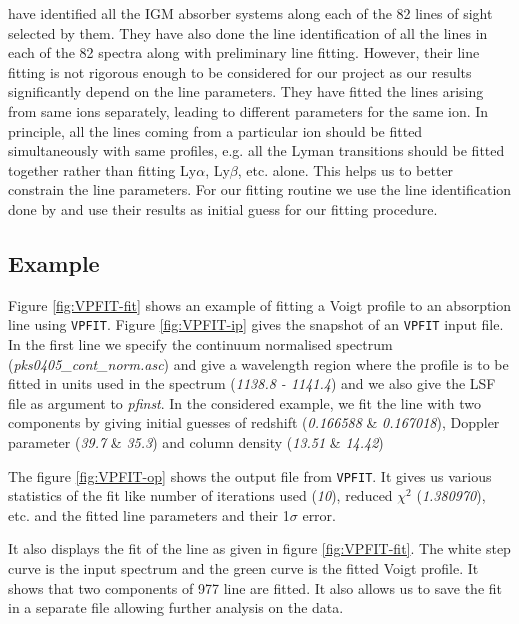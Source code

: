 \citet{danforth-2016} have identified all the IGM absorber systems along each of the 82 lines of sight selected by them. They have also done the line identification of all the lines in each of the 82 spectra along with preliminary line fitting. However, their line fitting is not rigorous enough to be considered for our project as our results significantly depend on the line parameters. They have fitted the lines arising from same ions separately, leading to different parameters for the same ion. In principle, all the lines coming from a particular ion should be fitted simultaneously with same profiles, e.g. all the Lyman transitions should be fitted together rather than fitting Ly$\alpha$, Ly$\beta$, etc. alone. This helps us to better constrain the line parameters. For our fitting routine we use the line identification done by \citet{danforth-2016} and use their results as initial guess for our fitting procedure.

\vfill

\subsection{Example}  \label{sec:VPfit-example}

Figure \ref{fig:VPFIT-fit} shows an example of fitting a Voigt profile to an absorption line using {\tt VPFIT}. Figure \ref{fig:VPFIT-ip} gives the snapshot of an {\tt VPFIT} input file. In the first line we specify the continuum normalised spectrum (\emph{pks0405\_cont\_norm.asc}) and give a wavelength region where the profile is to be fitted in units used in the spectrum (\emph{1138.8 - 1141.4}) and we also give the LSF file as argument to \emph{pfinst}. In the considered example, we fit the line with two  components by giving initial guesses of redshift (\emph{0.166588} \& \emph{0.167018}), Doppler parameter (\emph{39.7} \& \emph{35.3}) and column density (\emph{13.51} \& \emph{14.42})
 
The figure \ref{fig:VPFIT-op} shows the output file from {\tt VPFIT}. It gives us various statistics of the fit like number of iterations used (\emph{10}), reduced $\chi^2$ (\emph{1.380970}), etc. and the fitted line parameters and their 1$\sigma$ error.

It also displays the fit of the line as given in figure \ref{fig:VPFIT-fit}. The white step curve is the input spectrum and the green curve is the fitted Voigt profile. It shows that two components of  977 line are fitted. It also allows us to save the fit in a separate file allowing further analysis on the data.


